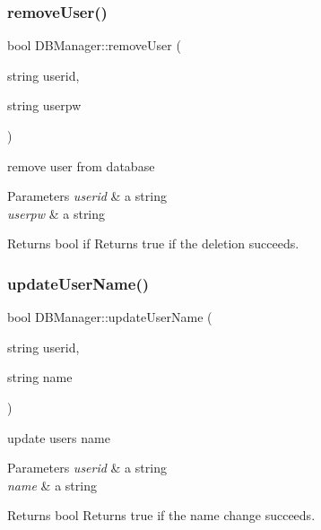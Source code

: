 \subsubsection{\texorpdfstring{remove\+User()}{removeUser()}}
{\footnotesize\ttfamily bool D\+B\+Manager\+::remove\+User (\begin{DoxyParamCaption}\item[{string}]{userid,  }\item[{string}]{userpw }\end{DoxyParamCaption})}



remove user from database 


\begin{DoxyParams}{Parameters}
{\em userid} & a string \\
\hline
{\em userpw} & a string \\
\hline
\end{DoxyParams}
\begin{DoxyReturn}{Returns}
bool if Returns true if the deletion succeeds. 
\end{DoxyReturn}
\mbox{\label{class_d_b_manager_a5778a4df0fe537979dc09a1265a4abee}} 
\subsubsection{\texorpdfstring{update\+User\+Name()}{updateUserName()}}
{\footnotesize\ttfamily bool D\+B\+Manager\+::update\+User\+Name (\begin{DoxyParamCaption}\item[{string}]{userid,  }\item[{string}]{name }\end{DoxyParamCaption})}



update user\textquotesingle{}s name 


\begin{DoxyParams}{Parameters}
{\em userid} & a string \\
\hline
{\em name} & a string \\
\hline
\end{DoxyParams}
\begin{DoxyReturn}{Returns}
bool Returns true if the name change succeeds. 
\end{DoxyReturn}
\mbox{\label{class_d_b_manager_aa2a2c53b87cc1200416f6e825e524410}} 
